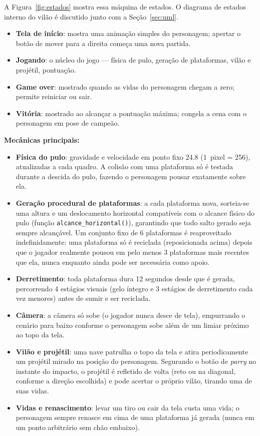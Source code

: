 \documentclass[a4paper,12pt]{article}
\newcommand{\code}[1]{\texttt{#1}}
\begin{document}
A Figura~\ref{fig:estados} mostra essa máquina de estados. O diagrama de
estados interno do vilão é discutido junto com a Seção~\ref{sec:uml}.

\begin{itemize}
    \item \textbf{Tela de início}: mostra uma animação simples do personagem;
    apertar o botão de mover para a direita começa uma nova partida.
    \item \textbf{Jogando}: o núcleo do jogo --- física de pulo, geração de
    plataformas, vilão e projétil, pontuação.
    \item \textbf{Game over}: mostrado quando as vidas do personagem chegam a
    zero; permite reiniciar ou sair.
    \item \textbf{Vitória}: mostrado ao alcançar a pontuação máxima; congela a
    cena com o personagem em pose de campeão.
\end{itemize}

\textbf{Mecânicas principais:}

\begin{itemize}
    \item \textbf{Física do pulo}: gravidade e velocidade em ponto fixo
    24.8 (1~pixel = 256), atualizadas a cada quadro. A colisão com uma
    plataforma só é testada durante a descida do pulo, fazendo o personagem
    pousar exatamente sobre ela.
    \item \textbf{Geração procedural de plataformas}: a cada plataforma nova,
    sorteia-se uma altura e um deslocamento horizontal compatíveis com o
    alcance físico do pulo (função \code{alcance\_horizontal()}), garantindo
    que todo salto gerado seja sempre alcançável. Um conjunto fixo de 6
    plataformas é reaproveitado indefinidamente: uma plataforma só é
    reciclada (reposicionada acima) depois que o jogador realmente pousou em
    pelo menos 3 plataformas mais recentes que ela, nunca enquanto ainda
    pode ser necessária como apoio.
    \item \textbf{Derretimento}: toda plataforma dura 12 segundos desde que é
    gerada, percorrendo 4 estágios visuais (gelo íntegro e 3 estágios de
    derretimento cada vez menores) antes de sumir e ser reciclada.
    \item \textbf{Câmera}: a câmera só sobe (o jogador nunca desce de tela),
    empurrando o cenário para baixo conforme o personagem sobe além de um
    limiar próximo ao topo da tela.
    \item \textbf{Vilão e projétil}: uma nave patrulha o topo da tela e atira
    periodicamente um projétil mirado na posição do personagem. Segurando o
    botão de \emph{parry} no instante do impacto, o projétil é refletido de
    volta (reto ou na diagonal, conforme a direção escolhida) e pode acertar
    o próprio vilão, tirando uma de suas vidas.
    \item \textbf{Vidas e renascimento}: levar um tiro ou cair da tela custa
    uma vida; o personagem sempre renasce em cima de uma plataforma já
    gerada (nunca em um ponto arbitrário sem chão embaixo).
\end{itemize}
\end{document}
